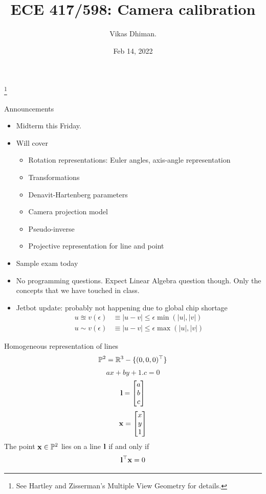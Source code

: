 \documentclass[times,t]{beamer}
\title{ECE 417/598: Camera calibration}
\author{Vikas Dhiman.  }
\date{Feb 14, 2022}
\begin{document}
\begin{frame}
  \titlepage
  \footnote{See Hartley  and Zisserman's Multiple   View  Geometry for  details.}
  \end{frame}

  \begin{frame}{Announcements}
    \begin{itemize}
      \item Midterm this Friday.
      \item Will cover
        \begin{itemize}
          \item Rotation representations: Euler angles, axis-angle representation
          \item Transformations 
          \item Denavit-Hartenberg parameters
          \item Camera projection model
          \item Pseudo-inverse
          \item Projective representation for line and point
        \end{itemize}
      \item Sample exam today
      \item No programming questions. Expect Linear Algebra question though.
        Only the concepts that we have touched in class. 
      \item Jetbot update: probably not happening due to global chip shortage
        \begin{align}
          u \approxeq v (\epsilon) &\equiv | u - v | \le \epsilon \min(|u|, |v|)
          \\
          u \sim v (\epsilon) &\equiv | u - v | \le \epsilon \max(|u|, |v|)
        \end{align}
    \end{itemize}
  \end{frame}
  
  \begin{frame}{Homogeneous representation of lines}
    \[ \mathbb{P}^2 = \mathbb{R}^3 - \{  (0, 0, 0)^\top \}   \]
    \[ ax + by + 1.c = 0\]
    \[ \mathbf{l} = \begin{bmatrix}
        a \\ b \\ c
        \end{bmatrix} \]
      \[ \mathbf{x} = \begin{bmatrix}
          x \\ y \\ 1
        \end{bmatrix} \]
      The point $\mathbf{x} \in \mathbb{P}^2$ lies on a line $\mathbf{l}$ if and only if
      \[ \mathbf{l}^\top \mathbf{x} = 0 \]
    \end{frame}
\end{document}
